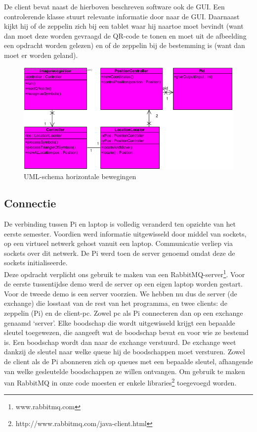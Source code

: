 \documentclass[eind]{penoverslag}
\begin{document}
De client bevat naast de hierboven beschreven software ook de GUI. Een controlerende klasse stuurt relevante informatie door naar de GUI. Daarnaast kijkt hij of de zeppelin zich bij een tablet waar hij naartoe moet bevindt (want dan moet deze worden gevraagd de QR-code te tonen en moet uit de afbeelding een opdracht worden gelezen) en of de zeppelin bij de bestemming is (want dan moet er worden geland).\\

\begin{figure}[H]
\begin{center}
\includegraphics[width=\textwidth]{classdiagrampeno.png}
\end{center}
\caption{UML-schema horizontale bewegingen}
\label{navigation}
\end{figure}

\subsection{Connectie}
De verbinding tussen Pi en laptop is volledig veranderd ten opzichte van het eerste semester. Voordien werd informatie uitgewisseld door middel van sockets, op een virtueel netwerk gehost vanuit een laptop. Communicatie verliep via sockets over dit netwerk. De Pi werd toen de server genoemd omdat deze de sockets initialiseerde.\\
Deze opdracht verplicht ons gebruik te maken van een RabbitMQ-server\footnote{www.rabbitmq.com}. Voor de eerste tussentijdse demo werd de server op een eigen laptop worden gestart. Voor de tweede demo is een server voorzien. We hebben nu dus de server (de exchange) die losstaat van de rest van het programma, en twee clients: de zeppelin (Pi) en de client-pc. Zowel pc als Pi connecteren dan op een exchange genaamd ‘server’. Elke boodschap die wordt uitgewisseld krijgt een bepaalde sleutel toegewezen, die aangeeft wat de boodschap bevat en voor wie ze bestemd is. Een boodschap wordt dan naar de exchange verstuurd. De exchange weet dankzij de sleutel naar welke queue hij de boodschappen moet versturen. Zowel de client als de Pi abonneren zich op queues met een bepaalde sleutel, afhangende van welke gesleutelde boodschappen ze willen ontvangen. Om gebruik te maken van RabbitMQ in onze code moesten er enkele libraries\footnote{http://www.rabbitmq.com/java-client.html} toegevoegd worden. \\
\end{document}
